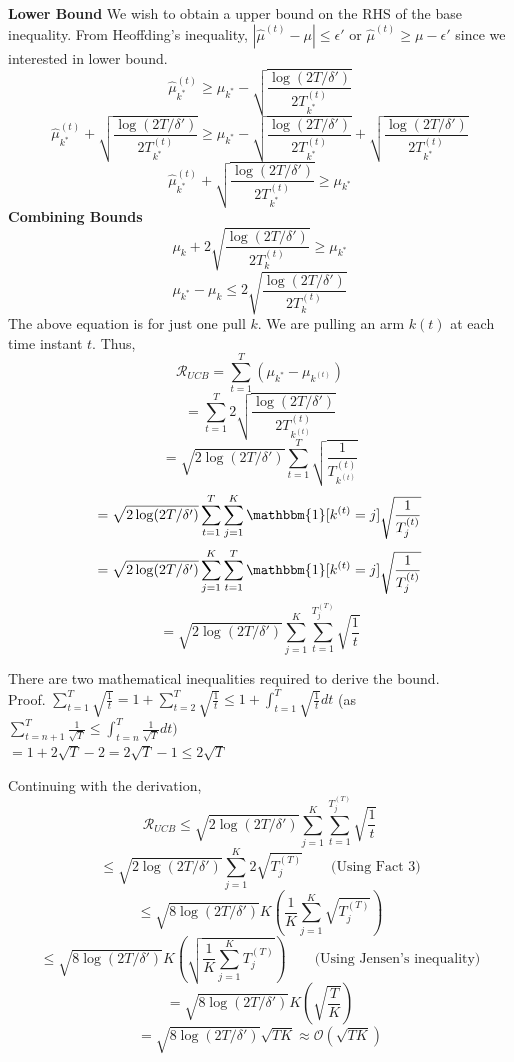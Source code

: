 \documentclass[11pt]{article}
\begin{document}
\textbf{Lower Bound} We wish to obtain a upper bound on the RHS of the base inequality. From Heoffding's inequality, $|\hat{\mu}^{(t)} - \mu| \le \epsilon'$ or $\hat{\mu}^{(t)} \ge \mu - \epsilon'$ since we interested in lower bound.
$$\hat{\mu}_{k^*}^{(t)} \ge \mu_{k^*} - \sqrt{\frac{\log(2T/\delta')}{2T_{k^*}^{(t)}}}$$
$$\hat{\mu}_{k^*}^{(t)} + \sqrt{\frac{\log(2T/\delta')}{2T_{k^*}^{(t)}}} \ge \mu_{k^*} - \sqrt{\frac{\log(2T/\delta')}{2T_{k^*}^{(t)}}} + \sqrt{\frac{\log(2T/\delta')}{2T_{k^*}^{(t)}}}$$
$$\hat{\mu}_{k^*}^{(t)} + \sqrt{\frac{\log(2T/\delta')}{2T_{k^*}^{(t)}}} \ge \mu_{k^*}$$
\textbf{Combining Bounds} 
$$\mu_k + 2\sqrt{\frac{\log(2T/\delta')}{2T_{k}^{(t)}}} \ge \mu_{k^*}$$
$$\mu_{k^*} - \mu_k \le 2\sqrt{\frac{\log(2T/\delta')}{2T_{k}^{(t)}}}$$
The above equation is for just one pull $k$. We are pulling an arm $k(t)$ at each time instant $t$. Thus,
$$\mathcal{R}_{UCB} = \sum_{t=1}^T (\mu_{k^*} - \mu_{k^{(t)}})$$
$$ = \sum_{t=1}^T 2\sqrt{\frac{\log(2T/\delta')}{2T_{k^{(t)}}^{(t)}}}$$
$$ = \sqrt{2\log(2T/\delta')} \sum_{t=1}^T \sqrt{\frac{1}{T_{k^{(t)}}^{(t)}}}$$
$$ = \sqrt{2\log(2T/\delta')} \sum_{t=1}^T \sum_{j=1}^K \mathbbm{1}[k^{(t)} = j]\sqrt{\frac{1}{T_{j}^{(t)}}}$$
$$ = \sqrt{2\log(2T/\delta')} \sum_{j=1}^K \sum_{t=1}^T \mathbbm{1}[k^{(t)} = j]\sqrt{\frac{1}{T_{j}^{(t)}}}$$
$$ = \sqrt{2\log(2T/\delta')} \sum_{j=1}^K \sum_{t=1}^{T_j^{(T)}} \sqrt{\frac{1}{t}}$$

There are two mathematical inequalities required to derive the bound.
\\
Proof. $\sum_{t=1}^{T}\sqrt{\frac{1}{t}} = 1 + \sum_{t=2}^{T}\sqrt{\frac{1}{t}} \le 1 + \int_{t=1}^{T}\sqrt{\frac{1}{t}}dt$ \hfill 
(as $\sum_{t=n+1}^T \frac{1}{\sqrt{T}} \le \int_{t=n}^T \frac{1}{\sqrt{T}}dt)$\\
$ = 1 + 2\sqrt{T} - 2 = 2\sqrt{T} - 1 \le 2\sqrt{T}$


\normalfont
Continuing with the derivation, 
$$\mathcal{R}_{UCB} \le \sqrt{2\log(2T/\delta')} \sum_{j=1}^K \sum_{t=1}^{T_j^{(T)}} \sqrt{\frac{1}{t}}$$
$$\le \sqrt{2\log(2T/\delta')} \sum_{j=1}^K 2\sqrt{T_j^{(T)}} \qquad \text{(Using Fact 3)}$$
$$\le \sqrt{8\log(2T/\delta')} K \left(\frac{1}{K}\sum_{j=1}^K \sqrt{T_j^{(T)}} \right)$$
$$\le \sqrt{8\log(2T/\delta')} K \left( \sqrt{\frac{1}{K}\sum_{j=1}^K T_j^{(T)}} \right)  \qquad \text{(Using Jensen's inequality)}$$
$$= \sqrt{8\log(2T/\delta')} K \left( \sqrt{\frac{T}{K}} \right)$$
$$= \sqrt{8\log(2T/\delta')} \sqrt{TK} \approx \mathcal{O}(\sqrt{TK})$$
\end{document}

